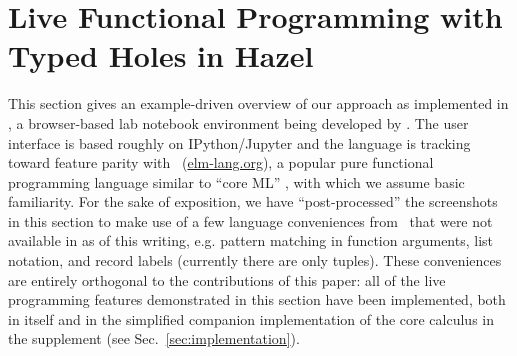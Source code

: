 \newcommand{\examplesSec}{Live Functional Programming with Typed Holes in Hazel}
\section{\protect\examplesSec} %
\label{sec:examples}




\newcommand{\overviewExample}[2]{\paragraph{Example {#1}: {#2}}}

This section gives an example-driven overview of our  approach as implemented in  \Hazel, a browser-based lab notebook environment being developed by \cite{HazelnutSNAPL}. The \Hazel user interface is  based roughly on IPython/Jupyter \cite{PER-GRA:2007} and the \Hazel language is tracking toward feature parity with \Elm~(\url{elm-lang.org}), a popular pure functional programming language similar to ``core ML'' \cite{czaplicki2012elm,Elm}, with which we assume basic  familiarity.
For the sake of 
exposition, we have ``post-processed'' the screenshots in this section to make use of a few language conveniences from \Elm~that were not available in \Hazel as of this writing, e.g. pattern matching in function arguments, list  notation, and record labels (currently there are only tuples). These conveniences are entirely orthogonal to the contributions of this paper: all of the live programming features demonstrated in this section have been implemented, both in \Hazel itself and in the simplified companion implementation of the core calculus in the supplement (see Sec.~\ref{sec:implementation}).







